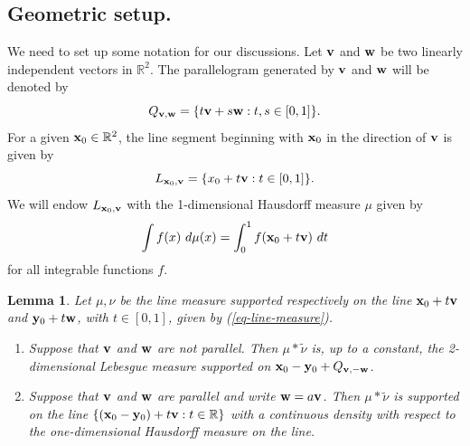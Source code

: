 \documentclass[12pt,a4paper,oneside]{amsart}
\newtheorem{lemma}{Lemma}
\theoremstyle{definition}
\newcommand{\RR}{{\mathbb R}}
\newcommand{\wt}[1]{\widetilde{#1}}
\newcounter{rem}
\begin{document}
\subsection{Geometric setup.} We need to set up some notation for our discussions. Let ${\bf v}$ and ${\bf w}$ be two linearly independent vectors in $\RR^2$. The parallelogram generated by ${\bf v}$ and ${\bf w}$ will be denoted by 
$$
Q_{\bf v,w} = \{t{\bf v}+s{\bf w}: t,s\in{[0,1]}\}.
$$
For a given ${\bf x}_0\in \RR^2$, the line segment beginning with ${\bf x}_0$ in the direction of ${\bf v}$ is given by 
$$
L_{{\bf x}_0,{\bf v}} = \{x_0+t{\bf v}: t\in[0,1]\}.
$$
We will endow $L_{{\bf x}_0,{\bf v}}$ with the 1-dimensional Hausdorff measure $\mu$ given by 
\begin{equation}\label{eq-line-measure}
\int f(x)~d\mu (x) = \int_0^1 f({\bf x}_0+t{\bf v})~dt
\end{equation}
for all integrable functions $f.$
\begin{lemma}\label{lemma_convolution}
Let $\mu,\nu$ be the line measure supported respectively on the line ${\bf x}_0+t{\bf v}$ and ${\bf y}_0+t{\bf w}$, with $t\in[0,1]$, given by (\ref{eq-line-measure}).
    \begin{enumerate}
    \item Suppose that ${\bf v}$ and ${\bf w}$ are not parallel. Then $\mu\ast\wt{\nu}$ is, up to a constant, the 2-dimensional Lebesgue measure supported on  ${\bf x}_0-{\bf y}_0 + Q_{\bf v,-w}$. 
    \item Suppose that ${\bf v}$ and ${\bf w}$ are parallel and write ${\bf w} = a{\bf v}$. Then $\mu\ast\wt{\nu}$ is supported on the line $\{({\bf x}_0-{\bf y}_0)+ t{\bf v}: t\in\RR\}$ with a continuous density with respect to the one-dimensional Hausdorff measure on the line.
    \end{enumerate}
\end{lemma}
\end{document}
